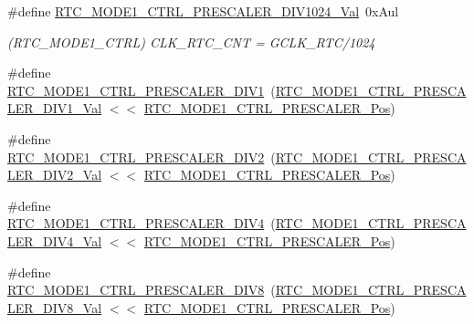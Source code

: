\begin{DoxyCompactItemize}
\#define \mbox{\hyperlink{group___s_a_m_d21___r_t_c_gadf403299b03aec41c70d48ccb2fcd812}{R\+T\+C\+\_\+\+M\+O\+D\+E1\+\_\+\+C\+T\+R\+L\+\_\+\+P\+R\+E\+S\+C\+A\+L\+E\+R\+\_\+\+D\+I\+V1024\+\_\+\+Val}}~0x\+Aul
\begin{DoxyCompactList}\small\item\em (R\+T\+C\+\_\+\+M\+O\+D\+E1\+\_\+\+C\+T\+RL) C\+L\+K\+\_\+\+R\+T\+C\+\_\+\+C\+NT = G\+C\+L\+K\+\_\+\+R\+T\+C/1024 \end{DoxyCompactList}\item 
\#define \mbox{\hyperlink{group___s_a_m_d21___r_t_c_ga98d73bfed4154ef54d6d2f4df08c0cff}{R\+T\+C\+\_\+\+M\+O\+D\+E1\+\_\+\+C\+T\+R\+L\+\_\+\+P\+R\+E\+S\+C\+A\+L\+E\+R\+\_\+\+D\+I\+V1}}~(\mbox{\hyperlink{group___s_a_m_d21___r_t_c_ga6ca17444586d0f47860a5b37b620c2fb}{R\+T\+C\+\_\+\+M\+O\+D\+E1\+\_\+\+C\+T\+R\+L\+\_\+\+P\+R\+E\+S\+C\+A\+L\+E\+R\+\_\+\+D\+I\+V1\+\_\+\+Val}} $<$$<$ \mbox{\hyperlink{group___s_a_m_d21___r_t_c_gad44b853d16e29aa5a84f3bb4087a6e1e}{R\+T\+C\+\_\+\+M\+O\+D\+E1\+\_\+\+C\+T\+R\+L\+\_\+\+P\+R\+E\+S\+C\+A\+L\+E\+R\+\_\+\+Pos}})
\item 
\#define \mbox{\hyperlink{group___s_a_m_d21___r_t_c_ga70207eb475eecc3a1164172e217f2501}{R\+T\+C\+\_\+\+M\+O\+D\+E1\+\_\+\+C\+T\+R\+L\+\_\+\+P\+R\+E\+S\+C\+A\+L\+E\+R\+\_\+\+D\+I\+V2}}~(\mbox{\hyperlink{group___s_a_m_d21___r_t_c_ga5139ae4965ed737224a36d45cf595d32}{R\+T\+C\+\_\+\+M\+O\+D\+E1\+\_\+\+C\+T\+R\+L\+\_\+\+P\+R\+E\+S\+C\+A\+L\+E\+R\+\_\+\+D\+I\+V2\+\_\+\+Val}} $<$$<$ \mbox{\hyperlink{group___s_a_m_d21___r_t_c_gad44b853d16e29aa5a84f3bb4087a6e1e}{R\+T\+C\+\_\+\+M\+O\+D\+E1\+\_\+\+C\+T\+R\+L\+\_\+\+P\+R\+E\+S\+C\+A\+L\+E\+R\+\_\+\+Pos}})
\item 
\#define \mbox{\hyperlink{group___s_a_m_d21___r_t_c_ga62665a17467b8b3d7c70e72703e34fed}{R\+T\+C\+\_\+\+M\+O\+D\+E1\+\_\+\+C\+T\+R\+L\+\_\+\+P\+R\+E\+S\+C\+A\+L\+E\+R\+\_\+\+D\+I\+V4}}~(\mbox{\hyperlink{group___s_a_m_d21___r_t_c_ga0bdab1ac69994f62919f3fc9945b3462}{R\+T\+C\+\_\+\+M\+O\+D\+E1\+\_\+\+C\+T\+R\+L\+\_\+\+P\+R\+E\+S\+C\+A\+L\+E\+R\+\_\+\+D\+I\+V4\+\_\+\+Val}} $<$$<$ \mbox{\hyperlink{group___s_a_m_d21___r_t_c_gad44b853d16e29aa5a84f3bb4087a6e1e}{R\+T\+C\+\_\+\+M\+O\+D\+E1\+\_\+\+C\+T\+R\+L\+\_\+\+P\+R\+E\+S\+C\+A\+L\+E\+R\+\_\+\+Pos}})
\item 
\#define \mbox{\hyperlink{group___s_a_m_d21___r_t_c_ga2f9bcf1ace7259dc80240a6c40e9569c}{R\+T\+C\+\_\+\+M\+O\+D\+E1\+\_\+\+C\+T\+R\+L\+\_\+\+P\+R\+E\+S\+C\+A\+L\+E\+R\+\_\+\+D\+I\+V8}}~(\mbox{\hyperlink{group___s_a_m_d21___r_t_c_ga4b9e0f566951e8e4206feff74086a57b}{R\+T\+C\+\_\+\+M\+O\+D\+E1\+\_\+\+C\+T\+R\+L\+\_\+\+P\+R\+E\+S\+C\+A\+L\+E\+R\+\_\+\+D\+I\+V8\+\_\+\+Val}} $<$$<$ \mbox{\hyperlink{group___s_a_m_d21___r_t_c_gad44b853d16e29aa5a84f3bb4087a6e1e}{R\+T\+C\+\_\+\+M\+O\+D\+E1\+\_\+\+C\+T\+R\+L\+\_\+\+P\+R\+E\+S\+C\+A\+L\+E\+R\+\_\+\+Pos}})

\end{DoxyCompactItemize}

